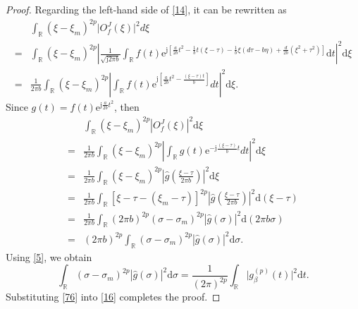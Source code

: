 \documentclass[preprint,12pt]{elsarticle}
\begin{document}
\begin{proof}
	Regarding the left-hand side of \eqref{14}, it can be rewritten as
	\begin{align*}
	&\int_{\mathbb{R}} (\xi-\xi_m)^{2p} \lvert O_f^J(\xi) \rvert^2 d \xi \nonumber\\
	=& \int_{\mathbb{R}} (\xi-\xi_m)^{2p} \left| \frac{1}{\sqrt{\mathrm{j} 2\pi b}} \int_{\mathbb{R}} f(t) \mathrm{e}^{\mathrm{j}[\frac{a}{2b} t^2-\frac{1}{b}t(\xi-\tau)-\frac{1}{b}\xi(d\tau -b \eta)+\frac{d}{2b}(\xi^2+\tau^2)]} \mathrm{d}t \right|^2 \mathrm{d} \xi \nonumber\\
	=&\frac{1}{2 \pi b} \int_{\mathbb{R}}(\xi-\xi_m)^{2p} \left| \int_{\mathbb{R}} f(t) \mathrm{e}^{\mathrm{j} [\frac{a}{2b} t^2-\frac{(\xi-\tau)t}{b}]}dt \right|^2 \mathrm{d}\xi.
	\end{align*}
	Since $g(t) = f(t)\mathrm{e}^{\mathrm{j} \frac{a}{2b} t^2}$, then
	\begin{align}
	\label{16}
	&\int_{\mathbb{R}} (\xi-\xi_m)^{2p} \left| O_f^J(\xi) \right|^2 \mathrm{d} \xi \nonumber\\
	=&\frac{1}{2 \pi b} \int_{\mathbb{R}}(\xi-\xi_m)^{2p} \left| \int_{\mathbb{R}} g(t) \mathrm{e}^{-\mathrm{j} \frac{(\xi-\tau)}{b}t}dt \right|^2 \mathrm{d} \xi \nonumber\\
	=&\frac{1}{2 \pi b} \int_{\mathbb{R}}(\xi-\xi_m)^{2p} \left| \hat{g}(\frac{\xi-\tau}{2 \pi b})\right|^2 \mathrm{d} \xi \nonumber\\
	=&\frac{1}{2 \pi b} \int_{\mathbb{R}} [\xi-\tau-(\xi_m-\tau)]^{2p} \left| \hat{g}(\frac{\xi-\tau}{2 \pi b}) \right|^2 \mathrm{d}( \xi-\tau) \nonumber \\
	=&\frac{1}{2 \pi b} \int_{\mathbb{R}} (2 \pi b)^{2p} (\sigma-\sigma_m)^{2p} \left| \hat{g}(\sigma) \right|^2 \mathrm{d}(2 \pi b \sigma) \nonumber\\
	=&(2 \pi b)^{2p} \int_{\mathbb{R}} (\sigma-\sigma_m)^{2p} \left| \hat{g}(\sigma) \right|^2 \mathrm{d}\sigma.
	\end{align}
	Using \eqref{5}, we obtain
	\begin{equation}
	\label{76}
	\int_{\mathbb{R}} (\sigma-\sigma_m)^{2p} \left| \hat{g}(\sigma) \right|^2 \mathrm{d}\sigma = \frac{1}{(2\pi )^{2p}} \int_{\mathbb{R}} \lvert g_{\beta}^{(p)}(t) \rvert^2 \mathrm{d}t.
	\end{equation}
	Substituting \eqref{76} into \eqref{16} completes the proof.
\end{proof}
\end{document}
